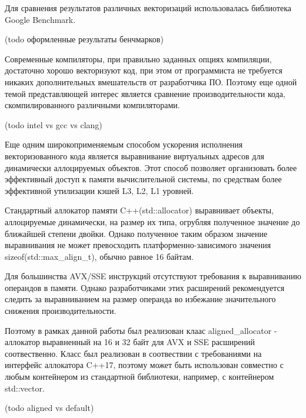 Для сравнения результатов различных векторизаций использовалась библиотека Google Benchmark.

(todo оформленные результаты бенчмарков)

Современные компиляторы, при правильно заданных опциях компиляции, достаточно хорошо векторизуют код,
при этом от программиста не требуется никаких дополнительных вмешательств от разработчика ПО.
Поэтому еще одной темой представляющей интерес является сравнение производительности кода,
скомпилированного различными компиляторами.

(todo intel vs gcc vs clang)

Еще одним широкоприменяемым способом ускорения исполнения векторизованного кода является выравнивание виртуальных адресов
для динамически аллоцируемых объектов. Этот способ позволяет организовать более эффективный доступ к памяти вычислительной системы,
по средствам более эффективной утилизации кэшей L3, L2, L1 уровней.

Стандартный аллокатор памяти C++(std::allocator) выравнивает объекты, аллоцируемые динамически, на размер их типа,
огрубляя полученное значение до ближайшей степени двойки.
Однако полученное таким образом значение выравнивания не может превосходить платформенно-зависимого значения sizeof(std::max\_align\_t),
обычно равное 16 байтам.

Для большинства AVX/SSE инструкций отсутствуют требования к выравниванию операндов в памяти. 
Однако разработчиками этих расширений рекомендуется следить за выравниванием на размер операнда
во избежание значительного снижения производительности.

Поэтому в рамках данной работы был реализован клаас aligned\_allocator - аллокатор выравненный
на 16 и 32 байт для AVX и SSE расширений соотвественно.
Класс был реализован в соотвествии с требованиями на интерфейс аллокатора C++17, поэтому может быть использован совместно с любым
контейнером из стандартной библиотеки, например, с контейнером std::vector.

(todo aligned vs default)

\clearpage